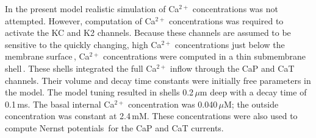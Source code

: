 \documentclass[12pt]{article}
\begin{document}
In the present model realistic simulation of Ca$^{2+}$ concentrations was not attempted. However, computation of Ca$^{2+}$ concentrations was required to activate the
KC and K2 channels. Because these channels are assumed to be
sensitive to the quickly changing, high Ca$^{2+}$ concentrations just
below the membrane surface\,\cite{L:1989ff}, Ca$^{2+}$ concentrations were 
computed in a thin submembrane shell\,\cite{D:1982lh}. These shells integrated the full Ca$^{2+}$ inflow through
the CaP and CaT channels. Their volume and decay time constants
were initially free parameters in the model. The model tuning
resulted in shells 0.2\,$\mu$m deep with a decay time of 0.1\,ms.
The basal internal Ca$^{2+}$ concentration was 0.040\,$\mu$M; the outside
concentration was constant at 2.4\,mM. These concentrations
were also used to compute Nernst potentials\,\cite{Hille:1991zr} for the
CaP and CaT currents.



\end{document}
